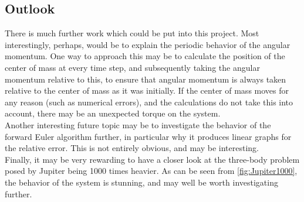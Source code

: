 \documentclass[a4paper, 10pt]{article}
\begin{document}
\subsection{Outlook}
There is much further work which could be put into this project. Most interestingly, perhaps, would be to explain the periodic behavior of the angular momentum. One way to approach this may be to calculate the position of the center of mass at every time step, and subsequently taking the angular momentum relative to this, to ensure that angular momentum is always taken relative to the center of mass as it was initially. If the center of mass moves for any reason (such as numerical errors), and the calculations do not take this into account, there may be an unexpected torque on the system.\\
\linebreak
Another interesting future topic may be to investigate the behavior of the forward Euler algorithm further, in particular why it produces linear graphs for the relative error. This is not entirely obvious, and may be interesting.\\
\linebreak
Finally, it may be very rewarding to have a closer look at the three-body problem posed by Jupiter being 1000 times heavier. As can be seen from \cref{fig:Jupiter1000}, the behavior of the system is stunning, and may well be worth investigating further.
\newpage
{}


\newpage
\end{document}
